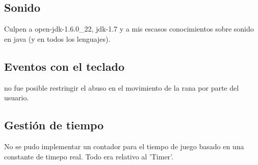 \documentclass[letter, 12pt] {article}
\begin{document}
\subsection* {Sonido}
Culpen a open-jdk-1.6.0\_22, jdk-1.7 y a mis escasos conocimientos
sobre sonido en java (y en todos los lenguajes).

\subsection* {Eventos con el teclado}
no fue posible restringir el abuso en el movimiento de la rana por
parte del usuario.

\subsection* {Gestión de tiempo}
No se pudo implementar un contador para el tiempo de juego basado en
una constante de timepo real. Todo era relativo al 'Timer'.
\end{document}
